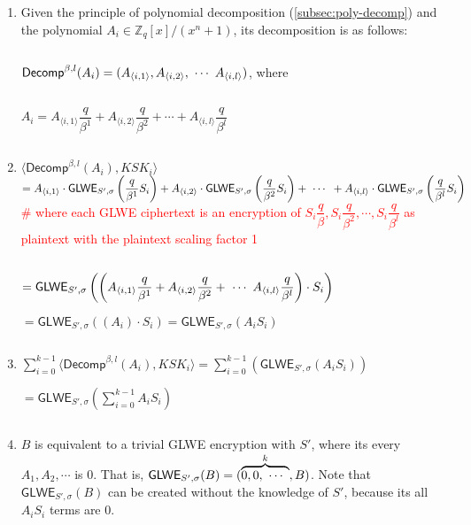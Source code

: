 \begin{myproof}

\begin{enumerate}
\item Given the principle of polynomial decomposition (\autoref{subsec:poly-decomp}) and the polynomial $A_i \in \mathbb{Z}_q[x] / (x^n + 1)$, its decomposition is as follows: 

$ $

$\textsf{Decomp}^{\beta, l}(A_i) = (A_{\langle i,1 \rangle}, A_{\langle i,2 \rangle}, \text{ } \text{$\cdots$} \text{ } A_{\langle i,l \rangle})$, where

$ $

$A_i = A_{\langle i, 1 \rangle} \dfrac{q}{\beta^1} + A _{\langle i, 2 \rangle}\dfrac{q}{\beta^2} + \cdots + A_{\langle i, l \rangle} \dfrac{q}{\beta^l}  $

$ $

\item $\langle \textsf{Decomp}^{\beta, l}(A_i), \mathit{KSK}_i \rangle $ \\
$ =  A_{\langle i,1 \rangle} \cdot \textsf{GLWE}_{S', \sigma} \left ( 
 \dfrac{q}{\beta^1}S_i \right ) + A_{\langle i,2 \rangle} \cdot \textsf{GLWE}_{S', \sigma} \left ( 
 \dfrac{q}{\beta^2}S_i \right ) + \text{ } \text{$\cdots$} \text{ } + A_{\langle i,l \rangle} \cdot \textsf{GLWE}_{S', \sigma} \left ( 
 \dfrac{q}{\beta^l}S_i \right ) $ 
\textcolor{red}{ \# where each \textsf{GLWE} ciphertext is an encryption of $S_i\dfrac{q}{\beta}, S_i\dfrac{q}{\beta^2}, \cdots, S_i\dfrac{q}{\beta^l}$ as plaintext with the plaintext scaling factor 1}

$ $
 
$= \textsf{GLWE}_{S', \sigma} \left ( 
 \left ( A_{\langle i,1 \rangle} \dfrac{q}{\beta^1} + A_{\langle i,2 \rangle} \dfrac{q}{\beta^2} + \text{ } \text{$\cdots$} \text{ } A_{\langle i,l \rangle} \dfrac{q}{\beta^l} \right ) \cdot S_i \right )$ 

 
$= \textsf{GLWE}_{S', \sigma} \left ( 
 \left ( A_i \right ) \cdot S_i \right ) = \textsf{GLWE}_{S', \sigma} ( 
 A_i  S_i ) $ 

$ $
 
 \item $\sum \limits_{i=0}^{k-1} \langle \textsf{Decomp}^{\beta, l}(A_i), \mathit{KSK}_i \rangle = \sum \limits_{i=0}^{k-1} (\textsf{GLWE}_{S', \sigma} ( 
 A_i  S_i )) $ 
 
 $= \textsf{GLWE}_{S', \sigma} \left ( \sum \limits_{i=0}^{k-1}  
 A_i  S_i  \right ) $

$ $
 
 \item $B$ is equivalent to a trivial GLWE encryption with $S'$, where its every $A_1, A_2, \cdots$ is 0. That is, $\textsf{GLWE}_{S', \sigma}(B) = (\overbrace{0, 0, \text{ } \text{$\cdots$} \text{ }}^k, B)$. Note that $\textsf{GLWE}_{S', \sigma}(B)$ can be created without the knowledge of $S'$, because its all $A_iS_i$ terms are $0$. 


\end{enumerate}
\end{myproof}
